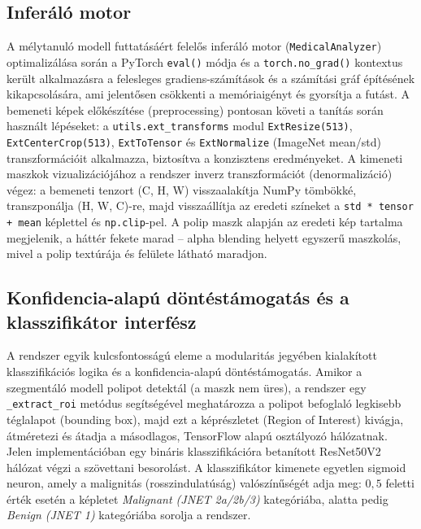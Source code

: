 \documentclass[12pt, a4paper]{report}
\begin{document}
\subsection{Inferáló motor}
A mélytanuló modell futtatásáért felelős inferáló motor (\texttt{MedicalAnalyzer}) optimalizálása során a PyTorch \texttt{eval()} módja és a \texttt{torch.no\_grad()} kontextus került alkalmazásra a felesleges gradiens-számítások és a számítási gráf építésének kikapcsolására, ami jelentősen csökkenti a memóriaigényt és gyorsítja a futást. A bemeneti képek előkészítése (preprocessing) pontosan követi a tanítás során használt lépéseket: a \texttt{utils.ext\_transforms} modul \texttt{ExtResize(513)}, \texttt{ExtCenterCrop(513)}, \texttt{ExtToTensor} és \texttt{ExtNormalize} (ImageNet mean/std) transzformációit alkalmazza, biztosítva a konzisztens eredményeket. A kimeneti maszkok vizualizációjához a rendszer inverz transzformációt (denormalizáció) végez: a bemeneti tenzort (C, H, W) visszaalakítja NumPy tömbökké, transzponálja (H, W, C)-re, majd visszaállítja az eredeti színeket a \texttt{std * tensor + mean} képlettel és \texttt{np.clip}-pel. A polip maszk alapján az eredeti kép tartalma megjelenik, a háttér fekete marad – alpha blending helyett egyszerű maszkolás, mivel a polip textúrája és felülete látható maradjon.

\subsection{Konfidencia-alapú döntéstámogatás és a klasszifikátor interfész}
A rendszer egyik kulcsfontosságú eleme a modularitás jegyében kialakított klasszifikációs logika és a konfidencia-alapú döntéstámogatás. Amikor a szegmentáló modell polipot detektál (a maszk nem üres), a rendszer egy \texttt{\_extract\_roi} metódus segítségével meghatározza a polipot befoglaló legkisebb téglalapot (bounding box), majd ezt a képrészletet (Region of Interest) kivágja, átméretezi és átadja a másodlagos, TensorFlow alapú osztályozó hálózatnak. Jelen implementációban egy bináris klasszifikációra betanított ResNet50V2 hálózat végzi a szövettani besorolást. A klasszifikátor kimenete egyetlen sigmoid neuron, amely a malignitás (rosszindulatúság) valószínűségét adja meg: $0,5$ feletti érték esetén a képletet \textit{Malignant (JNET 2a/2b/3)} kategóriába, alatta pedig \textit{Benign (JNET 1)} kategóriába sorolja a rendszer. 
\end{document}
